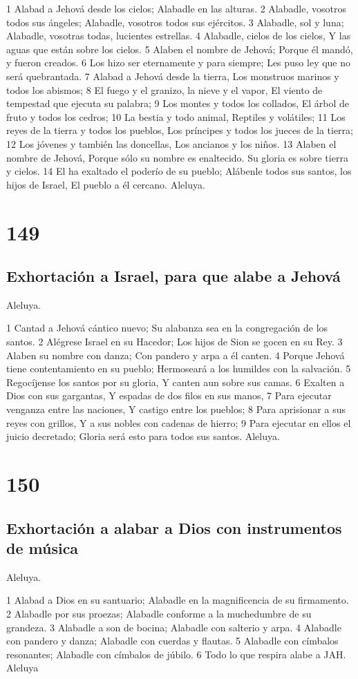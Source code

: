 1 Alabad a Jehová desde los cielos;
Alabadle en las alturas.
2 Alabadle, vosotros todos sus ángeles;
Alabadle, vosotros todos sus ejércitos.
3 Alabadle, sol y luna;
Alabadle, vosotras todas, lucientes estrellas.
4 Alabadle, cielos de los cielos,
Y las aguas que están sobre los cielos.
5 Alaben el nombre de Jehová;
Porque él mandó, y fueron creados.
6 Los hizo ser eternamente y para siempre;
Les puso ley que no será quebrantada.
7 Alabad a Jehová desde la tierra,
Los monstruos marinos y todos los abismos;
8 El fuego y el granizo, la nieve y el vapor,
El viento de tempestad que ejecuta su palabra;
9 Los montes y todos los collados,
El árbol de fruto y todos los cedros;
10 La bestia y todo animal,
Reptiles y volátiles;
11 Los reyes de la tierra y todos los pueblos,
Los príncipes y todos los jueces de la tierra;
12 Los jóvenes y también las doncellas,
Los ancianos y los niños.
13 Alaben el nombre de Jehová,
Porque sólo su nombre es enaltecido.
Su gloria es sobre tierra y cielos.
14 El ha exaltado el poderío de su pueblo;
Alábenle todos sus santos, los hijos de Israel,
El pueblo a él cercano.
Aleluya.

\chapter{149}

\section*{Exhortación a Israel, para que alabe a Jehová}

Aleluya.

1 Cantad a Jehová cántico nuevo;
Su alabanza sea en la congregación de los santos.
2 Alégrese Israel en su Hacedor;
Los hijos de Sion se gocen en su Rey.
3 Alaben su nombre con danza;
Con pandero y arpa a él canten.
4 Porque Jehová tiene contentamiento en su pueblo;
Hermoseará a los humildes con la salvación.
5 Regocíjense los santos por su gloria,
Y canten aun sobre sus camas.
6 Exalten a Dios con sus gargantas,
Y espadas de dos filos en sus manos,
7 Para ejecutar venganza entre las naciones,
Y castigo entre los pueblos;
8 Para aprisionar a sus reyes con grillos,
Y a sus nobles con cadenas de hierro;
9 Para ejecutar en ellos el juicio decretado;
Gloria será esto para todos sus santos.
Aleluya.

\chapter{150}

\section*{Exhortación a alabar a Dios con instrumentos de música}

Aleluya.

1 Alabad a Dios en su santuario;
Alabadle en la magnificencia de su firmamento.
2 Alabadle por sus proezas;
Alabadle conforme a la muchedumbre de su grandeza.
3 Alabadle a son de bocina;
Alabadle con salterio y arpa.
4 Alabadle con pandero y danza;
Alabadle con cuerdas y flautas.
5 Alabadle con címbalos resonantes;
Alabadle con címbalos de júbilo.
6 Todo lo que respira alabe a JAH.
Aleluya



